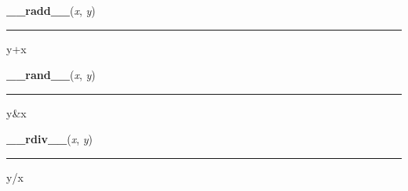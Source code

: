     \label{numpy:ndarray:__radd__}

    \vspace{0.5ex}

    \begin{boxedminipage}{\textwidth}

    \raggedright \textbf{\_\_radd\_\_}(\textit{x}, \textit{y})

    \vspace{-1.5ex}

    \rule{\textwidth}{0.5\fboxrule}

y+x
    \vspace{1ex}

    \end{boxedminipage}

    \label{numpy:ndarray:__rand__}

    \vspace{0.5ex}

    \begin{boxedminipage}{\textwidth}

    \raggedright \textbf{\_\_rand\_\_}(\textit{x}, \textit{y})

    \vspace{-1.5ex}

    \rule{\textwidth}{0.5\fboxrule}

y{\&}x
    \vspace{1ex}

    \end{boxedminipage}

    \label{numpy:ndarray:__rdiv__}

    \vspace{0.5ex}

    \begin{boxedminipage}{\textwidth}

    \raggedright \textbf{\_\_rdiv\_\_}(\textit{x}, \textit{y})

    \vspace{-1.5ex}

    \rule{\textwidth}{0.5\fboxrule}

y/x
    \vspace{1ex}

    \end{boxedminipage}

    \label{numpy:ndarray:__rdivmod__}

